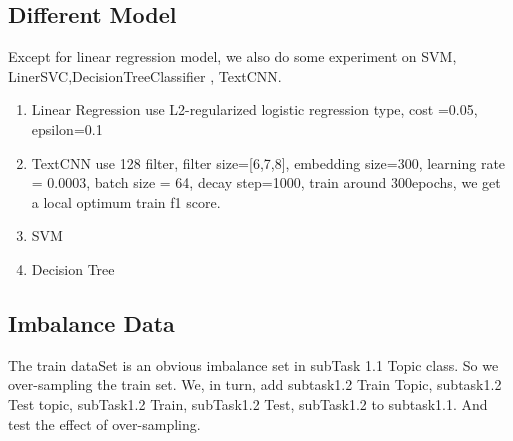 

\subsection{Different Model}
\label{sec:different_model}

Except for linear regression model, we also do some experiment on SVM, LinerSVC,DecisionTreeClassifier , TextCNN. 

\begin{enumerate}
    \item Linear Regression use L2-regularized logistic regression type, cost =0.05, epsilon=0.1
    \item TextCNN use 128 filter, filter size=[6,7,8], embedding size=300, learning rate = 0.0003, batch size = 64, decay step=1000, train around 300epochs, we get a local optimum train f1 score.
    \item SVM 
    \item Decision Tree
\end{enumerate}



\subsection{Imbalance Data}
\label{sec:impalance_data}

The train dataSet is an obvious imbalance set in subTask 1.1 Topic class. So we over-sampling the train set. We, in turn, add subtask1.2 Train Topic, subtask1.2 Test topic, subTask1.2 Train, subTask1.2 Test, subTask1.2 to subtask1.1. And test the effect of over-sampling.


